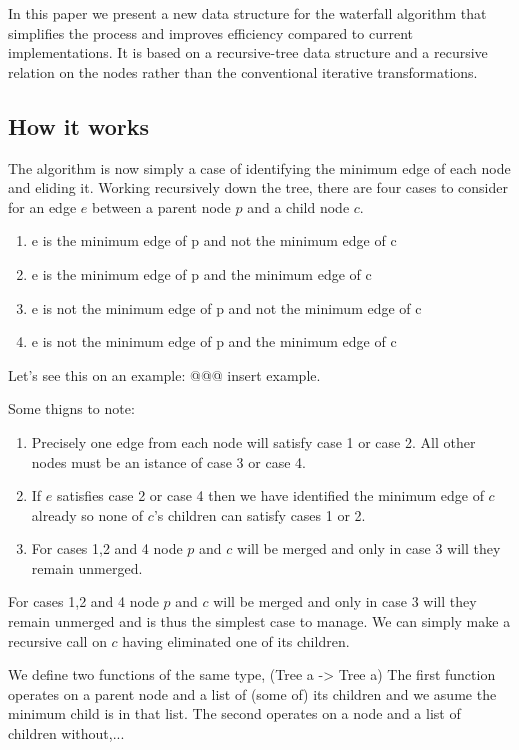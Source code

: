 \documentclass{jfp}
\begin{document}
In this paper we present a new data structure for the waterfall
algorithm that simplifies the process and improves efficiency compared
to current implementations. It is based on a recursive-tree data
structure and a recursive relation on the nodes rather than the
conventional iterative transformations.


\subsection{How it works}

 
The algorithm is now simply a case of identifying the minimum edge
of each node and eliding it. Working recursively down the tree,
there are four cases to consider for an edge $e$ between a parent node
$p$ and a child node $c$.
\begin{enumerate}
\item e is     the minimum edge of p and not the minimum edge of c
\item e is     the minimum edge of p and     the minimum edge of c
\item e is not the minimum edge of p and not the minimum edge of c
\item e is not the minimum edge of p and     the minimum edge of c
\end{enumerate}


Let's see this on an example:
@@@ insert example.


Some thigns to note:
\begin{enumerate}
\item Precisely one edge from each node will satisfy case 1 or case 2. All other nodes must be an istance of case 3 or case 4.
\item If $e$ satisfies case 2 or case 4 then we have identified the minimum edge of $c$ already so none of $c$'s children can satisfy cases 1 or 2.
\item For cases 1,2 and 4 node $p$ and $c$ will be merged and only in case 3 will they remain unmerged.
\end{enumerate}

For cases 1,2 and 4 node $p$ and $c$ will be merged and only in case 3 will they remain unmerged and is thus the simplest case to manage.
We can simply make a recursive call on $c$ having eliminated one of its children.


We define two functions of the same type,  (Tree a -> Tree a)
The first function operates on a parent node and a list of (some of) its children and we asume the minimum child is in that list.
The second operates on a node and a list of children without,...
\end{document}
